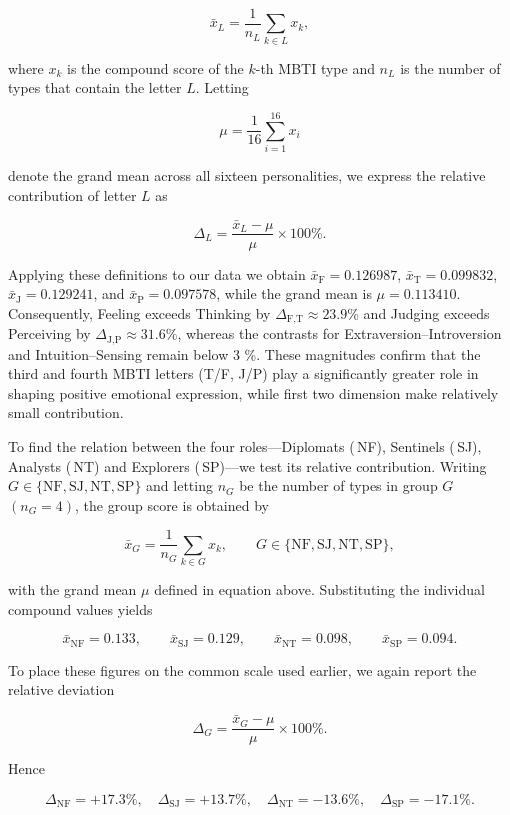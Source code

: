 \documentclass[12pt]{article}
\begin{document}
	$$
	\bar{x}_{L}=\frac{1}{n_{L}}\sum_{k\in L}x_{k},
	$$
	
	where $x_{k}$ is the compound score of the $k$-th MBTI type and $n_{L}$ is the number of types that contain the letter $L$.  Letting
	
	$$
	\mu=\frac{1}{16}\sum_{i=1}^{16}x_{i}
	$$
	
	denote the grand mean across all sixteen personalities, we express the relative contribution of letter $L$ as
	
	$$
	\Delta_{L}= \frac{\bar{x}_{L}-\mu}{\mu}\times100\%.
	$$
	
	Applying these definitions to our data we obtain $\bar{x}_{\text{F}}=0.126987$, $\bar{x}_{\text{T}}=0.099832$, $\bar{x}_{\text{J}}=0.129241$, and $\bar{x}_{\text{P}}=0.097578$, while the grand mean is $\mu=0.113410$.  Consequently, Feeling exceeds Thinking by $\Delta_{\text{F,T}}\approx 23.9\%$ and Judging exceeds Perceiving by $\Delta_{\text{J,P}}\approx 31.6\%$, whereas the contrasts for Extraversion–Introversion and Intuition–Sensing remain below 3 \%.  These magnitudes confirm that the third and fourth MBTI letters (T/F, J/P) play a significantly greater role in shaping positive emotional expression, while first two dimension make relatively small contribution.
	
	To find the relation between the four roles—Diplomats ( NF), Sentinels ( SJ), Analysts ( NT) and Explorers ( SP)—we test its relative contribution. Writing $G\in\{\text{NF},\text{SJ},\text{NT},\text{SP}\}$ and letting $n_{G}$ be the number of types in group $G$ $(n_{G}=4)$, the group score is obtained by
	
	$$
	\bar{x}_{G}= \frac{1}{n_{G}}\sum_{k\in G}x_{k},
	\qquad
	G\in\{\text{NF},\text{SJ},\text{NT},\text{SP}\},
	$$
	
	with the grand mean $\mu$ defined in equation above.  Substituting the individual compound values yields
	
	$$
	\bar{x}_{\text{NF}} = 0.133,\qquad 
	\bar{x}_{\text{SJ}} = 0.129,\qquad
	\bar{x}_{\text{NT}} = 0.098,\qquad
	\bar{x}_{\text{SP}} = 0.094 .
	$$
	
	To place these figures on the common scale used earlier, we again report the relative deviation
	
	$$
	\Delta_{G}= \frac{\bar{x}_{G}-\mu}{\mu}\times 100\% .
	$$
	
	Hence
	
	$$
	\Delta_{\text{NF}}=+17.3\%,\quad 
	\Delta_{\text{SJ}}=+13.7\%,\quad
	\Delta_{\text{NT}}=-13.6\%,\quad
	\Delta_{\text{SP}}=-17.1\%.
	$$
	
\end{document}
